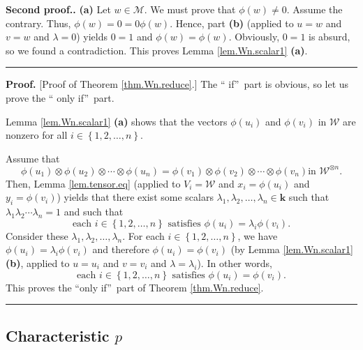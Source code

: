 \documentclass[numbers=enddot,12pt,final,onecolumn,notitlepage]{scrartcl}%
\theoremstyle{definition}
\newenvironment{proof}[1][Proof]{\noindent\textbf{#1.} }{\ \rule{0.5em}{0.5em}}
\newcommand{\W}{\mathcal{W}}
\newcommand{\M}{\mathcal{M}}
\newcommand{\kk}{\mathbf{k}}
\newenvironment{verlong}{}{}
\begin{document}
\begin{proof}[Second proof.]
\textbf{(a)} Let $w\in\M$. We must prove that $\phi\left(  w\right)
\neq0$. Assume the contrary. Thus, $\phi\left(  w\right)  =0=0\phi\left(
w\right)  $. Hence, part \textbf{(b)} (applied to $u=w$ and $v=w$ and
$\lambda=0$) yields $0=1$ and $\phi\left(  w\right)  =\phi\left(  w\right)  $.
Obviously, $0=1$ is absurd, so we found a contradiction. This proves Lemma
\ref{lem.Wn.scalar1} \textbf{(a)}.
\end{proof}

\begin{verlong}
\begin{proof}
[Proof of Theorem \ref{thm.Wn.reduce}.] The \textquotedblleft
if\textquotedblright\ part is obvious, so let us prove the \textquotedblleft
only if\textquotedblright\ part.

Lemma \ref{lem.Wn.scalar1} \textbf{(a)} shows that the vectors $\phi\left(
u_{i}\right)  $ and $\phi\left(  v_{i}\right)  $ in $\W$ are nonzero
for all $i\in\left\{  1,2,\ldots,n\right\}  $.

Assume that
\[
\phi\left(  u_{1}\right)  \otimes\phi\left(  u_{2}\right)  \otimes
\cdots\otimes\phi\left(  u_{n}\right)  =\phi\left(  v_{1}\right)  \otimes
\phi\left(  v_{2}\right)  \otimes\cdots\otimes\phi\left(  v_{n}\right)  \text{
in }\W^{\otimes n}.
\]
Then, Lemma \ref{lem.tensor.eq} (applied to $V_{i}=\W$ and
$x_{i}=\phi\left(  u_{i}\right)  $ and $y_{i}=\phi\left(  v_{i}\right)  $)
yields that there exist some scalars $\lambda_{1},\lambda_{2},\ldots
,\lambda_{n}\in\kk$ such that $\lambda_{1}\lambda_{2}\cdots\lambda
_{n}=1$ and such that
\[
\text{each }i\in\left\{  1,2,\ldots,n\right\}  \text{ satisfies }\phi\left(
u_{i}\right)  =\lambda_{i}\phi\left(  v_{i}\right)  .
\]
Consider these $\lambda_{1},\lambda_{2},\ldots,\lambda_{n}$. For each
$i\in\left\{  1,2,\ldots,n\right\}  $, we have $\phi\left(  u_{i}\right)
=\lambda_{i}\phi\left(  v_{i}\right)  $ and therefore $\phi\left(
u_{i}\right)  =\phi\left(  v_{i}\right)  $ (by Lemma \ref{lem.Wn.scalar1}
\textbf{(b)}, applied to $u=u_{i}$ and $v=v_{i}$ and $\lambda = \lambda_i$). In other words,
\[
\text{each }i\in\left\{  1,2,\ldots,n\right\}  \text{ satisfies }\phi\left(
u_{i}\right)  =\phi\left(  v_{i}\right)  .
\]
This proves the \textquotedblleft only if\textquotedblright\ part of Theorem
\ref{thm.Wn.reduce}.
\end{proof}
\end{verlong}

\subsection{Characteristic $p$}
\end{document}
